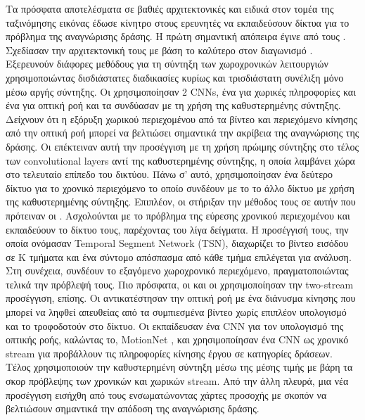 Τα πρόσφατα αποτελέσματα σε βαθιές αρχιτεκτονικές και ειδικά στον τομέα της ταξινόμησης εικόνας  έδωσε κίνητρο στους ερευνητές να εκπαιδεύσουν δίκτυα  για
το πρόβλημα της αναγνώρισης δράσης. Η πρώτη σημαντική απόπειρα έγινε από τους \en\cite{6909619}\gr. Σχεδίασαν την αρχιτεκτονική τους με βάση το καλύτερο 
στον διαγωνισμό  .
Εξερευνούν διάφορες μεθόδους για τη σύντηξη των χωροχρονικών λειτουργιών χρησιμοποιώντας δισδιάστατες διαδικασίες κυρίως και τρισδιάστατη συνέλιξη μόνο μέσω αργής σύντηξης.
Οι \en \cite{simonyan2014two} \gr χρησιμοποίησαν 2 \en CNNs\gr, ένα για χωρικές πληροφορίες και ένα για οπτική ροή
και τα συνδύασαν  με τη χρήση της καθυστερημένης σύντηξης. Δείχνουν ότι η εξόρυξη χωρικού περιεχομένου από τα βίντεο και περιεχόμενο κίνησης από την οπτική ροή μπορεί να βελτιώσει
σημαντικά την ακρίβεια της αναγνώρισης της δράσης. Οι \en\cite{DBLP:journals/corr/FeichtenhoferPZ16} \gr επέκτειναν αυτή την προσέγγιση με τη χρήση πρώιμης σύντηξης στο τέλος των \en convolutional
layers \gr αντί της  καθυστερημένης σύντηξης, η οποία λαμβάνει χώρα στο τελευταίο επίπεδο του δικτύου. Πάνω σ' αυτό, χρησιμοποίησαν ένα δεύτερο δίκτυο για το χρονικό περιεχόμενο το οποίο
συνδέουν με το το άλλο δίκτυο με χρήση της καθυστερημένης σύντηξης. Επιπλέον, οι \en \cite{DBLP:journals/corr/WangXW0LTG16} \gr στήριξαν την μέθοδος τους
σε αυτήν που πρότειναν οι \en \cite{simonyan2014two}\gr. Ασχολούνται με το πρόβλημα  της εύρεσης χρονικού περιεχομένου και εκπαιδεύουν το δίκτυο τους, παρέχοντας του λίγα δείγματα.
Η προσέγγισή τους, την οποία ονόμασαν \en Temporal Segment Network (TSN), \gr διαχωρίζει το βίντεο εισόδου σε K τμήματα  και ένα σύντομο απόσπασμα από κάθε τμήμα επιλέγεται για ανάλυση.
Στη συνέχεια, συνδέουν  το εξαγόμενο χωροχρονικό περιεχόμενο, πραγματοποιώντας τελικά την πρόβλεψή τους. Πιο πρόσφατα, οι \en \cite{DBLP:journals/corr/ZhangWWQW16} \gr και οι \en \cite{DBLP:journals/corr/ZhuLNH17a} \gr χρησιμοποίησαν την \en two-stream \gr προσέγγιση, επίσης. Οι \en \cite{DBLP:journals/corr/ZhangWWQW16} \gr αντικατέστησαν την οπτική ροή με ένα διάνυσμα κίνησης που μπορεί να ληφθεί απευθείας
από τα  συμπιεσμένα βίντεο χωρίς επιπλέον υπολογισμό και το τροφοδοτούν στο δίκτυο. Οι \en  \cite{DBLP:journals/corr/ZhuLNH17a} \gr εκπαίδευσαν ένα  \en CNN  \gr για τον υπολογισμό της οπτικής ροής,
καλώντας το, \en MotionNet \gr, και χρησιμοποίησαν ένα \en CNN \gr ως  χρονικό \en stream \gr για προβάλλουν τις πληροφορίες κίνησης έργου σε κατηγορίες δράσεων. Τέλος
χρησιμοποιούν την καθυστερημένη σύντηξη μέσω της μέσης τιμής με βάρη τα σκορ πρόβλεψης των χρονικών και χωρικών \en stream\gr. Από την άλλη πλευρά, μια νέα προσέγγιση εισήχθη από τους
\en\cite{DBLP:journals/corr/abs-1711-01467}\gr ενσωματώνοντας χάρτες προσοχής με σκοπόν να βελτιώσουν σημαντικά  την απόδοση της αναγνώρισης δράσης. \par


